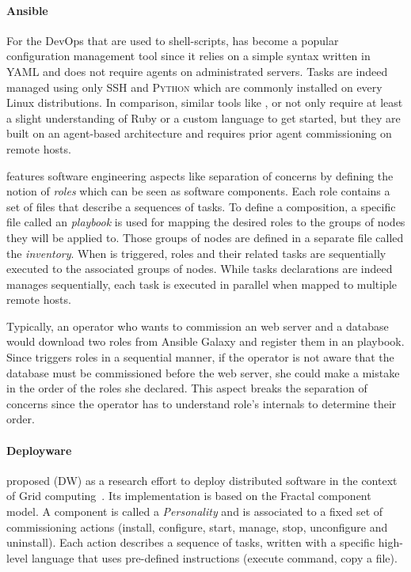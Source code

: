 \paragraph{Ansible}
For the DevOps that are used to shell-scripts, \ansible has become a popular
configuration management tool since it relies on a simple syntax written in YAML
and does not require agents on administrated servers. Tasks are indeed managed
using only \textsc{SSH} and \textsc{Python} which are commonly installed on
every Linux distributions.
In comparison, similar tools like \chef, \puppet or \cfengine not only require
at least a slight understanding of Ruby or a custom language to get started, but
they are built on an agent-based architecture and requires prior agent
commissioning on remote hosts.

\ansible features software engineering aspects like separation of concerns by
defining the notion of \emph{roles} which can be seen as software components.
Each role contains a set of files that describe a sequences of tasks. To define
a composition, a specific file called an \ansible \emph{playbook} is used for
mapping the desired roles to the groups of nodes they will be applied to. Those
groups of nodes are defined in a separate file called the \emph{inventory}. When
\ansible is triggered, roles and their related tasks are sequentially executed
to the associated groups of nodes.  While tasks declarations are indeed manages
sequentially, each task is executed in parallel when mapped to multiple remote
hosts.

Typically, an operator who wants to commission an \apache web server and a
\mysql database would download two roles from Ansible Galaxy and register them
in an playbook. Since \ansible triggers roles in a sequential manner, if the
operator is not aware that the database must be commissioned before the web
server, she could make a mistake in the order of the roles she declared. This
aspect breaks the separation of concerns since the operator has to understand
role's internals to determine their order.


\paragraph{Deployware}
\citeauthor{flissi2008ccgrid} proposed \deployware (DW) as a research effort to
deploy distributed software in the context of Grid
computing~\cite{flissi2008ccgrid}. Its implementation is based on the Fractal
component model. A component is called a \emph{Personality} and is associated to
a fixed set of commissioning actions (\ie install, configure, start, manage,
stop, unconfigure and uninstall).  Each action describes a sequence of tasks,
written with a specific high-level language that uses pre-defined instructions
(\eg execute command, copy a file).


